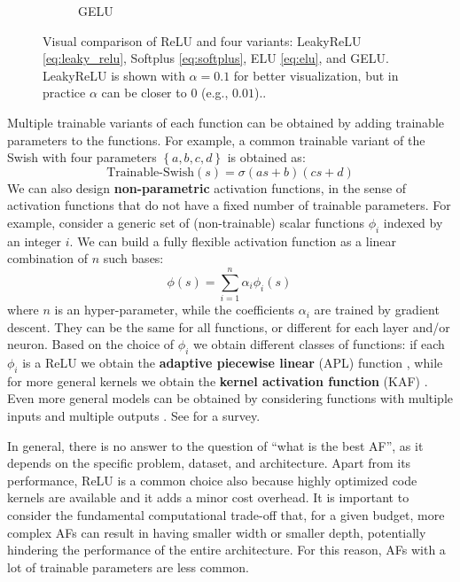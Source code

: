 \begin{figure}[t]
\begin{subfigure}[b]{0.18\textwidth}
    \caption{GELU}
    \end{subfigure}
    \hfill
    \caption{Visual comparison of ReLU and four variants: LeakyReLU \eqref{eq:leaky_relu}, Softplus \eqref{eq:softplus}, ELU \eqref{eq:elu}, and GELU. LeakyReLU is shown with $\alpha=0.1$ for better visualization, but in practice $\alpha$ can be closer to $0$ (e.g., $0.01$)..}
    \label{fig:activation_functions}
\end{figure}

Multiple trainable variants of each function can be obtained by adding trainable parameters to the functions. For example, a common trainable variant of the Swish with four parameters $\left\{a,b,c,d\right\}$ is obtained as:
%
\begin{equation}
\text{Trainable-Swish}(s)=\sigma(as+b)(cs+d)
\label{eq:trainable_swish}
\end{equation}
%
We can also design \textbf{non-parametric} activation functions, in the sense of activation functions that do not have a fixed number of trainable parameters. For example, consider a generic set of (non-trainable) scalar functions $\phi_i$ indexed by an integer $i$. We can build a fully flexible activation function as a linear combination of $n$ such bases:
%
\begin{equation}
\phi(s) = \sum_{i=1}^n \alpha_i \phi_i(s) \,
\label{eq:non_parametric_af}
\end{equation}
%
where $n$ is an hyper-parameter, while the coefficients $\alpha_i$ are trained by gradient descent. They can be the same for all functions, or different for each layer and/or neuron. Based on the choice of $\phi_i$ we obtain different classes of functions: if each $\phi_i$ is a ReLU we obtain the \textbf{adaptive piecewise linear} (APL) function \cite{agostinelli2014learning}, while for more general kernels we obtain the \textbf{kernel activation function} (KAF) \cite{marra2018learning,scardapane2019kafnets}. Even more general models can be obtained by considering functions with multiple inputs and multiple outputs \cite{li2023generalized}. See \cite{apicella2021survey} for a survey.

In general, there is no answer to the question of “what is the best AF”, as it depends on the specific problem, dataset, and architecture. Apart from its performance, ReLU is a common choice also because highly optimized code kernels are available and it adds a minor cost overhead. It is important to consider the fundamental computational trade-off that, for a given budget, more complex AFs can result in having smaller width or smaller depth, potentially hindering the performance of the entire architecture. For this reason, AFs with a lot of trainable parameters are less common.

